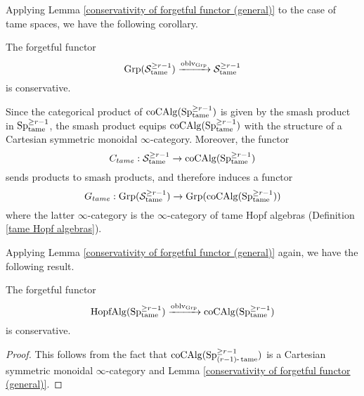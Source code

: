 Applying Lemma \ref{conservativity of forgetful functor (general)} to the case of tame spaces, we have the following corollary.

\begin{corollary}
\label{conservativity of forgetful functor}
	The forgetful functor 
	\[
	\operatorname{Grp}({\mathcal{S}}^{\geq r-1}_{\operatorname{\operatorname{tame}}}) \xrightarrow{\operatorname{oblv}_{\operatorname{Grp}}} 
	{\mathcal{S}}^{\geq r-1}_{\operatorname{\operatorname{tame}}}
	\]
	is conservative.
\end{corollary}

Since the categorical product of $\operatorname{coCAlg}(\operatorname{Sp}^{\geq r-1}_{\operatorname{\operatorname{tame}}})$ is given by the smash product in $\operatorname{Sp}^{\geq r-1}_{\operatorname{\operatorname{tame}}}$, 
the smash product equips $\operatorname{coCAlg}(\operatorname{Sp}^{\geq r-1}_{\operatorname{\operatorname{tame}}})$ with the structure of a Cartesian symmetric monoidal $\infty$-category. Moreover, the functor 
$$C_{tame}: {\mathcal{S}}^{\geq r-1}_{\operatorname{\operatorname{tame}}} \to
\operatorname{coCAlg}(\operatorname{Sp}^{\geq r-1}_{\operatorname{\operatorname{tame}}})$$
sends products to smash products, and therefore induces a functor
\begin{equation}
\label{G_tame}
    G_{tame}:\operatorname{Grp}({\mathcal{S}}^{\geq r-1}_{\operatorname{\operatorname{tame}}})
\to
\operatorname{Grp}(\operatorname{coCAlg}(\operatorname{Sp}^{\geq r-1}_{\operatorname{\operatorname{tame}}}))
\end{equation}
where the latter $\infty$-category is the $\infty$-category of tame Hopf algebras (Definition \ref{tame Hopf algebras}).

Applying Lemma \ref{conservativity of forgetful functor (general)} again, we have the following result.
\begin{corollary}
\label{conservativity of the forgetful functor for Hopf algebras}
		The forgetful functor 
	\[
	\operatorname{HopfAlg}(\operatorname{Sp}^{\geq r-1}_{\operatorname{\operatorname{tame}}}) \xrightarrow{\operatorname{oblv}_{\operatorname{Grp}}} 
	\operatorname{coCAlg}(\operatorname{Sp}^{\geq r-1}_{\operatorname{\operatorname{tame}}})
	\]
	is conservative.
\end{corollary}
\begin{proof}
	This follows from the fact that $\operatorname{coCAlg}(\operatorname{Sp}^{\geq r-1}_{(r-1)\text{-}\operatorname{\operatorname{tame}}})$ is a Cartesian symmetric monoidal $\infty$-category and Lemma \ref{conservativity of forgetful functor (general)}.

\end{proof}

